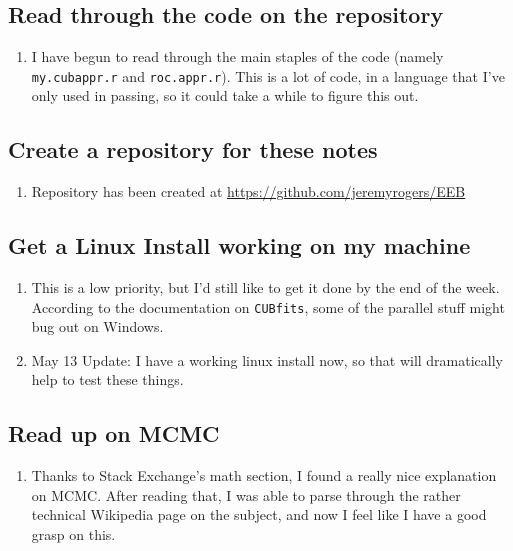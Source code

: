 \documentclass[12 pt]{article}
\begin{document}
		\subsection{Read through the code on the repository}
			\begin{enumerate}
				\item I have begun to read through the main staples of the code (namely \texttt{my.cubappr.r} and \texttt{roc.appr.r}). This is a lot of code, in a language that I've only used in passing, so it could take a while to figure this out. 
			\end{enumerate}

		
		\subsection{Create a repository for these notes}
			\begin{enumerate}
				\item Repository has been created at \url{https://github.com/jeremyrogers/EEB}
			\end{enumerate}
			
		\subsection{Get a Linux Install working on my machine}
			\begin{enumerate}
				\item This is a low priority, but I'd still like to get it done by the end of the week. According to the documentation on \texttt{CUBfits}, some of the parallel stuff might bug out on Windows.
				\item May 13 Update: I have a working linux install now, so that will dramatically help to test these things.
			\end{enumerate}
			
		\subsection{Read up on MCMC}
			\begin{enumerate}
				\item Thanks to Stack Exchange's math section, I found a really nice explanation on MCMC. After reading that, I was able to parse through the rather technical Wikipedia page on the subject, and now I feel like I have a good grasp on this.
			\end{enumerate}
		
\end{document}
